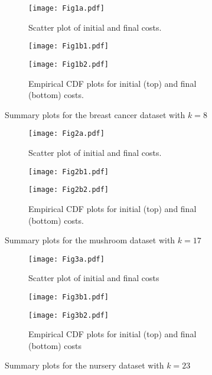 \begin{figure}
    \begin{subfigure}{.5\textwidth}
        \texttt{[image: Fig1a.pdf]}
        \caption{Scatter plot of initial and final costs.}
    \end{subfigure}
    \hfill%
    \begin{subfigure}{.5\textwidth}
        \texttt{[image: Fig1b1.pdf]}

        \texttt{[image: Fig1b2.pdf]}
        \caption{Empirical CDF plots for initial (top) and final (bottom)
                 costs.}
    \end{subfigure}
    \caption{Summary plots for the breast cancer dataset with \(k=8\)}%
    \label{fig:breast_cancer_knee}
\end{figure}

\begin{figure}
    \begin{subfigure}{.5\textwidth}
        \texttt{[image: Fig2a.pdf]}
        \caption{Scatter plot of initial and final costs.}
    \end{subfigure}
    \hfill%
    \begin{subfigure}{.5\textwidth}
        \texttt{[image: Fig2b1.pdf]}

        \texttt{[image: Fig2b2.pdf]}
        \caption{Empirical CDF plots for initial (top) and final (bottom)
                 costs.}
    \end{subfigure}
    \caption{Summary plots for the mushroom dataset with \(k=17\)}%
    \label{fig:mushroom_knee}
\end{figure}

\begin{figure}
    \begin{subfigure}{.5\textwidth}
        \texttt{[image: Fig3a.pdf]}
        \caption{Scatter plot of initial and final costs}
    \end{subfigure}
    \hfill%
    \begin{subfigure}{.5\textwidth}
        \texttt{[image: Fig3b1.pdf]}

        \texttt{[image: Fig3b2.pdf]}
        \caption{Empirical CDF plots for initial (top) and final (bottom) costs}
    \end{subfigure}
    \caption{Summary plots for the nursery dataset with \(k=23\)}%
    \label{fig:nursery_knee}
\end{figure}

